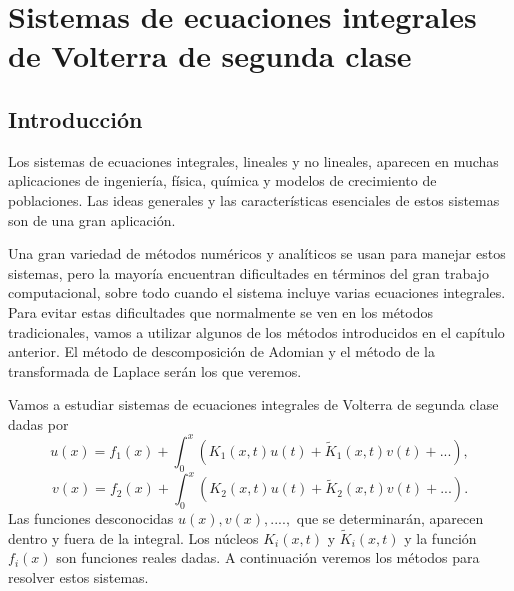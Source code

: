\chapter{Sistemas de ecuaciones integrales de Volterra de segunda clase}
\section{Introducción}
Los sistemas de ecuaciones integrales, lineales y no lineales, aparecen en muchas aplicaciones de ingeniería, física, química y modelos de crecimiento de poblaciones. Las ideas generales y las características esenciales de estos sistemas son de una gran aplicación.

Una gran variedad de métodos numéricos y analíticos se usan para manejar estos sistemas, pero la mayoría encuentran dificultades en términos del gran trabajo computacional, sobre todo cuando el sistema incluye varias ecuaciones integrales. Para evitar estas dificultades que normalmente se ven en los métodos tradicionales, vamos a utilizar algunos de los métodos introducidos en el capítulo anterior. El método de descomposición de Adomian y el método de la transformada de Laplace serán los que veremos.

Vamos a estudiar sistemas de ecuaciones integrales de Volterra de segunda clase dadas por
\begin{equation}
	u(x) = f_1(x) + \int_{0}^{x}(K_1(x,t)u(t) + \tilde{K}_1(x,t)v(t)+...),
\end{equation}
\begin{equation}
	v(x) = f_2(x) + \int_{0}^{x}(K_2(x,t)u(t) + \tilde{K}_2(x,t)v(t)+...).
\end{equation}
Las funciones desconocidas $u(x), v(x), .... ,$ que se determinarán, aparecen dentro y fuera de la integral. Los núcleos $K_i(x,t)$ y $\tilde{K}_i(x,t)$ y la función $f_i(x)$ son funciones reales dadas. A continuación veremos los métodos para resolver estos sistemas.
